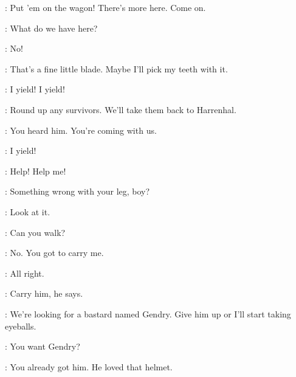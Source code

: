 

\POLLIVER: Put 'em on the wagon! There's more here. Come on. 


\POLLIVER: What do we have here? 

\ARYA: No! 


\POLLIVER: That's a fine little blade. Maybe I'll pick my teeth with it. 

\HOTPIE: I yield! I yield! 

\AMORY: Round up any survivors. We'll take them back to Harrenhal. 

\POLLIVER: You heard him. You're coming with us. 

\HOTPIE: I yield! 

\LOMMY: Help! Help me! 

\POLLIVER: Something wrong with your leg, boy? 

\LOMMY: Look at it. 

\POLLIVER: Can you walk? 

\LOMMY: No. You got to carry me. 

\POLLIVER: All right. 


\POLLIVER: Carry him, he says. 


\AMORY: We're looking for a bastard named Gendry. Give him up or I'll start taking eyeballs. 

\ARYA: You want Gendry?


\ARYA: You already got him. He loved that helmet. 


